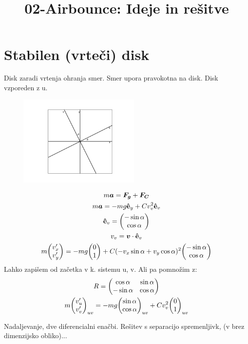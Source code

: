\documentclass[11pt,a4paper]{article}
\title{02-Airbounce: Ideje in rešitve}
\date{}
\begin{document}
\maketitle

\section{Stabilen (vrteči) disk}
Disk zaradi vrtenja ohranja smer. Smer upora pravokotna na disk. Disk vzporeden z u.
\begin{figure}[H]
\centering
	\includegraphics[width=6cm]{stabilen_disk_kot_frizbija.png}
\end{figure}

\begin{gather}
m \bm{a} = \bm{{F_g}} + \bm{F_C}\\
m \bm{a} = -mg \vu{e}_y + C v_v^2 \vu{e}_v\\
\vu{e}_v = \mqty(-\sin \alpha \\ \cos \alpha)\\
v_v = \bm{v} \cdot \vu{e}_v\\
m \mqty(v_x' \\ v_y') = -mg \mqty(0 \\ 1) + C (-v_x \sin \alpha + v_y \cos \alpha)^2 \mqty(-\sin \alpha \\ \cos \alpha)
\end{gather}
Lahko zapišem od začetka v k. sistemu u, v. Ali pa pomnožim z:
\begin{gather}
R = \mqty(\cos \alpha & \sin \alpha \\ -\sin \alpha & \cos \alpha)\\
m \mqty(v_u' \\ v_v')_{uv} = -mg \mqty(\sin \alpha \\ \cos \alpha)_{uv} + C v_v^2 \mqty(0 \\ 1)_{uv}
\end{gather}

Nadaljevanje, dve diferencialni enačbi. Rešitev s separacijo spremenljivk, (v brez dimenzijsko obliko)...
\end{document}
